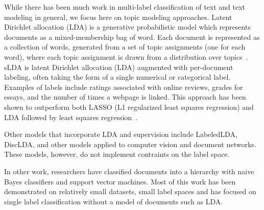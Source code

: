 While there has been much work in multi-label classification of text and
text modeling in general, we focus here on topic modeling approaches.
Latent Dirichlet allocation (LDA) is a generative probabilistic model which
represents documents as a mixed-membership bag of word. Each document is
represented as a collection of words, generated from a set of topic assignments
(one for each word), where each topic assignment is drawn from a distribution
over topics~\citep{Blei2003}. sLDA is latent Dirichlet allocation (LDA)
\cite{Blei2003} augmented with per-document labeling, often taking the form of
a single numerical or categorical label. Examples of labels include ratings
associated with online reviews, grades for essays, and the number of times a
webpage is linked. This approach has been shown to outperform both LASSO
(L1 regularized least squares regression) and LDA followed by least
squares regression~\cite{BleiMcAuliffe2008}.



Other models that incorporate LDA and supervision include
LabeledLDA\citep{Ramage2009}, DiscLDA\citep{DiscLDA}, and other models applied to 
computer vision and document networks\citep{wangbleifeifei08,RelationalLDA}. 
These models, however, do not implement contraints on the label space.

In other work, researchers have classified documents into a hierarchy with naive Bayes classifiers
and support vector machines. Most of this work has been demonstrated on relatively
small datasets, small label spaces and has focused on single label classification without
a model of documents such as LDA\citep{mccallum99building,Dumais2000HCW,Kollerilprints291,Chakrabarti1998SFS}.

